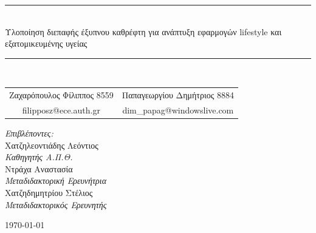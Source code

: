 \begin{titlepage}
\begin{center}
		\rule{\linewidth}{0.5mm}\\[0.5cm]
		
		\LARGE{Υλοποίηση διεπαφής έξυπνου καθρέφτη για ανάπτυξη εφαρμογών lifestyle και εξατομικευμένης υγείας}
		
		\rule{\linewidth}{0.5mm}\\[2cm]
		
		\large
		\begin{tabular}{c@{\hskip 0.5cm}|@{\hskip 0.5cm}c}
			Ζαχαρόπουλος Φίλιππος 8559 & Παπαγεωργίου Δημήτριος 8884\\
			\small{filipposz@ece.auth.gr} & \small{dim\_papag@windowslive.com}\\
		\end{tabular}
		
		\vfill
		
		\large
		\textsl{Επιβλέποντες:}\\[0.5cm]
		Χατζηλεοντιάδης Λεόντιος\\
		{\normalsize\textsl{Καθηγητής Α.Π.Θ.}}\\[0.4cm]
		Ντράχα Αναστασία\\
		{\normalsize\textsl{Μεταδιδακτορική Ερευνήτρια}}\\[0.4cm]
		Χατζηδημητρίου Στέλιος\\
		{\normalsize\textsl{Μεταδιδακτορικός Ερευνητής}}\\
		
		\vfill
		
		\large{\today}
	\end{center}
\end{titlepage}
